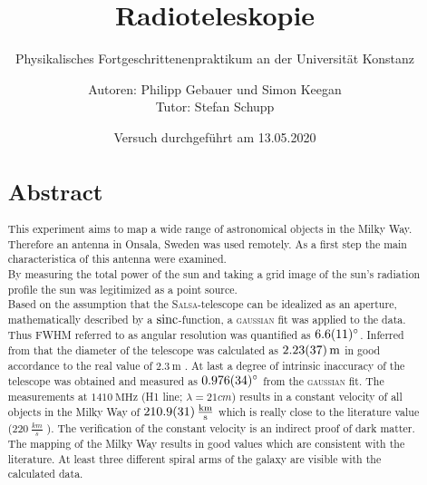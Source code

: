 \title{Radioteleskopie}
\subtitle{Physikalisches Fortgeschrittenenpraktikum an der Universität Konstanz}
\author{Autoren: Philipp Gebauer und Simon Keegan \\ \large{Tutor: Stefan Schupp}}
\date{Versuch durchgeführt am 13.05.2020}
\maketitle
\vspace{2.5 cm}
\begin{abstract}
    \section*{Abstract}
    \begin{singlespace}
    This experiment aims to map a wide range of astronomical objects in the Milky Way. Therefore an antenna in Onsala, Sweden was used remotely.
    As a first step the main characteristica of this antenna were examined.\\
    By measuring the total power of the sun and taking a grid image of the sun's radiation profile the sun was legitimized as a point source. \\
    Based on the assumption that the \textsc{Salsa}-telescope can be idealized as an aperture, mathematically described by a $\operatorname{sinc}$-function, a \textsc{gaussian} fit was applied to the data. Thus FWHM referred to as angular resolution was quantified as $\SI{6.6 \pm 1.1}{\degree}$. Inferred from that the diameter of the telescope was calculated as $\SI{2.23 \pm 0.37}{\metre}$ in good accordance to the real value of $\SI{2.3}{\metre}$ \cite{Usermanual}. At last a degree of intrinsic inaccuracy of the telescope was obtained and measured as $\SI{0.976 \pm 0.034}{\degree}$ from the \textsc{gaussian} fit.\newline
    The measurements at $\SI{1410}{\mega \hertz}$ (H1 line; $\lambda = \si{21}{cm}$) results in a constant velocity of all objects in the Milky Way of $\SI{210.9 \pm 3.1}{\frac{km}{s}}$ which is really close to the literature value ($\SI{220}{\frac{km}{s}}$ \cite{LSR}). The verification of the constant velocity is an indirect proof of dark matter.\newline
    The mapping of the Milky Way results in good values which are consistent with the literature. At least three different spiral arms of the galaxy are visible with the calculated data.
\end{singlespace}
\end{abstract}

\thispagestyle{empty}
\newpage